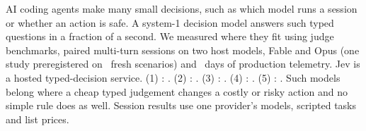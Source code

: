AI coding agents make many small decisions, such as which model runs a session or whether an action is safe. A system-1 decision model answers such typed questions in a fraction of a second. We measured where they
fit using judge benchmarks, paired multi-turn sessions on two host models, Fable and Opus (one study preregistered on
\SOnePanelN\ fresh scenarios) and \ObDays\ days of production telemetry. Jev is a hosted typed-decision service.
(1) :  . (2) : 
. (3) :  . (4) : 
. (5) :  . Such models belong where a cheap typed judgement
changes a costly or risky action and no simple rule does as well. Session results use one
provider's models, scripted tasks and list prices.

